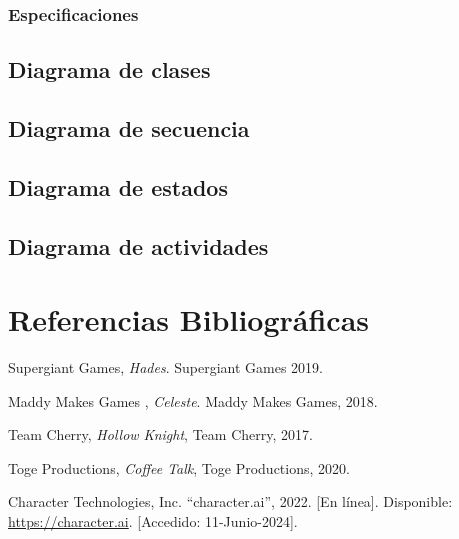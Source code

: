 \documentclass[12pt,twoside]{article}
\begin{document}
	\subsubsection{Especificaciones}
	
	\subsection{Diagrama de clases}

	\subsection{Diagrama de secuencia}

	\subsection{Diagrama de estados}

	\subsection{Diagrama de actividades}

	\clearpage
	
	\section{Referencias Bibliográficas}
	
	\begin{thebibliography}{10}
	
	Supergiant Games, \textit{Hades}. Supergiant Games 2019.
	
	Maddy Makes Games , \textit{Celeste}. Maddy Makes Games, 2018.
	
	Team Cherry, \textit{Hollow Knight}, Team Cherry, 2017.
	
	Toge Productions, \textit{Coffee Talk}, Toge Productions, 2020.
	
	Character Technologies, Inc. ``character.ai'', 2022. [En línea]. Disponible: \url{https://character.ai}.  [Accedido: 11-Junio-2024].

	\end{thebibliography}
	
\end{document}
